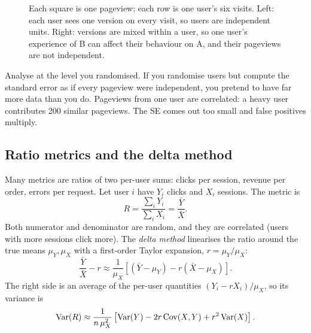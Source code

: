 \begin{figure}[H]
\centering
{}
\caption{Each square is one pageview; each row is one user's six visits.
Left: each user sees one version on every visit, so users are independent
units. Right: versions are mixed within a user, so one user's experience of B
can affect their behaviour on A, and their pageviews are not independent.}
\label{fig:cg-unit}
\end{figure}

\begin{trapbox}
Analyse at the level you randomised. If you randomise users but compute the
standard error as if every pageview were independent, you pretend to have far
more data than you do. Pageviews from one user are correlated: a heavy user
contributes 200 similar pageviews. The SE comes out too small and false
positives multiply.
\end{trapbox}

\subsection{Ratio metrics and the delta method}

Many metrics are ratios of two per-user sums: clicks per session, revenue per
order, errors per request. Let user $i$ have $Y_i$ clicks and $X_i$ sessions.
The metric is
\[
  R = \frac{\sum_i Y_i}{\sum_i X_i} = \frac{\bar Y}{\bar X}.
\]
Both numerator and denominator are random, and they are correlated (users with
more sessions click more). The \emph{delta method} linearises the ratio around
the true means $\mu_Y, \mu_X$ with a first-order Taylor expansion, $r = \mu_Y/\mu_X$:
\[
  \frac{\bar Y}{\bar X} - r \approx \frac{1}{\mu_X}\left[(\bar Y - \mu_Y) - r(\bar X - \mu_X)\right].
\]
The right side is an average of the per-user quantities $(Y_i - rX_i)/\mu_X$,
so its variance is
\[
  \operatorname{Var}(R) \approx \frac{1}{n\,\mu_X^2}\left[\operatorname{Var}(Y) - 2r\operatorname{Cov}(X,Y) + r^2\operatorname{Var}(X)\right].
\]

